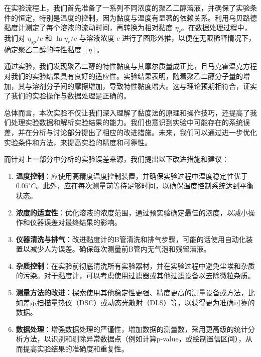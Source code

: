 \documentclass[12pt,hyperref,a4paper,UTF8]{ctexart}
\begin{document}
在实验流程上，我们首先准备了一系列不同浓度的聚乙二醇溶液，并确保了实验条件的恒定，特别是温度的控制，因为黏度与温度有显著的依赖关系。利用乌贝路德黏度计测定了每个溶液的流动时间，再转换为相对黏度 $\eta_{r}$。在数据处理过程中，我们对 $\eta_{sp}/c$ 和 $\ln{\eta_{r}/c}$ 与溶液浓度 $c$ 进行了图形外推，以便在无限稀释情况下，确定聚乙二醇的特性黏度 $[\eta]$。

通过实验，我们发现聚乙二醇的特性黏度与其摩尔质量成正比，且马克霍温克方程对我们的实验结果具有良好的适应性。实验结果表明，随着聚乙二醇分子量的增加，其与溶剂分子间的摩擦增加，导致特性黏度增大。这与理论预期相符合，证实了我们的实验操作与数据处理是正确的。

总体而言，本次实验不仅让我们深入理解了黏度法的原理和操作技巧，还提高了我们处理实验数据和解析实验结果的能力。我们也意识到实验中可能存在的系统误差，并在分析与讨论部分提出了相应的改进措施。未来，我们可以通过进一步优化实验条件和方法，来提高实验的精度和可靠性。

而针对上一部分中分析的实验误差来源，我们提出以下改进措施和建议：

\begin{enumerate}
	\item \textbf{温度控制}：应使用高精度温度控制装置，并确保实验过程中温度稳定性优于 $0.05^\circ C$。此外，应在每次测量前等待足够时间，以确保温度控制系统达到平衡状态。
	
	\item \textbf{浓度的适宜性}：优化溶液的浓度范围，通过预实验确定最佳的浓度，以减小操作和仪器误差对最终结果的影响。
	
	\item \textbf{仪器清洗与排气}：改进黏度计的B管清洗和排气步骤，可能的话使用自动化装置以减少人为误差。确保每次测量前B管内无气泡和残留溶液。
	
	\item \textbf{杂质控制}：在实验前彻底清洗所有实验器材，并在实验过程中避免尘埃和杂质的污染。对于黏度计，可以考虑使用过滤器或其他过滤设备以去除微粒杂质。
	
	\item \textbf{测量方法的改进}：探索使用其他稳定性更强、精度更高的测量设备或方法，比如差示扫描量热仪（DSC）或动态光散射（DLS）等，以获得更为准确可靠的数据。
	
	\item \textbf{数据处理}：增强数据处理的严谨性，增加数据的测量数，采用更高级的统计分析方法，以识别和剔除异常数据点（例如计算p-value，或绘制置信区间），从而提高实验结果的准确度和重复性。
\end{enumerate}
\end{document}
